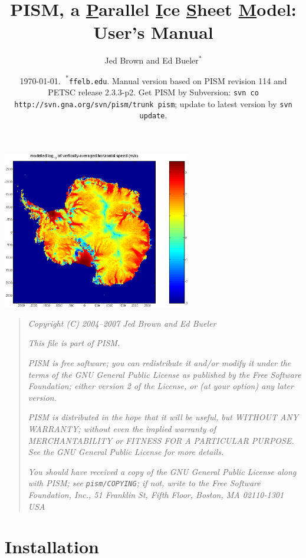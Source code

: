 \documentclass[12pt,final]{amsart}
\title[PISM User's Manual]{PISM, a \underline{P}arallel \underline{I}ce \underline{S}heet \underline{M}odel: \\ User's Manual}
\author[]{Jed Brown and Ed $\text{Bueler}^\ast$}
\date{\today.  $\phantom{|}^\ast$\texttt{ffelb\@@uaf.edu}.  Manual version based on PISM revision 114 and PETSC release 2.3.3-p2.  Get PISM by Subversion: \texttt{svn co http://svn.gna.org/svn/pism/trunk pism}; update to latest version by \texttt{svn update}.}
\newcommand{\normalspacing}{\renewcommand{\baselinestretch}{1.1}\tiny\normalsize}
\newcommand{\tablespacing}{\renewcommand{\baselinestretch}{1.0}\tiny\normalsize}
\begin{document}
\maketitle
\thispagestyle{empty}

\setcounter{tocdepth}{1}
\tableofcontents

\begin{center}
\includegraphics[height=2.7in,keepaspectratio=true]{figs/ant153k_mv100_speed}
\end{center}

\newpage
\phantom{bob}
\vspace{2in}
\begin{quote}
\textsl{Copyright (C) 2004--2007 Jed Brown and Ed Bueler}
\medskip

\noindent \textsl{This file is part of PISM.}
\medskip

\noindent \textsl{PISM is free software; you can redistribute it and/or modify it under the terms of the GNU General Public License as published by the Free Software Foundation; either version 2 of the License, or (at your option) any later version.}
\medskip

\noindent \textsl{PISM is distributed in the hope that it will be useful, but WITHOUT ANY WARRANTY; without even the implied warranty of MERCHANTABILITY or FITNESS FOR A PARTICULAR PURPOSE.  See the GNU General Public License for more details.}
\medskip

\noindent \textsl{You should have received a copy of the GNU General Public License along with PISM; see \emph{\texttt{pism/COPYING}}; if not, write to the Free Software Foundation, Inc., 51 Franklin St, Fifth Floor, Boston, MA  02110-1301 USA}
\end{quote}
\vspace{1in}
\normalspacing

\newpage
\section{Installation}\label{sect:install}
\end{document}
